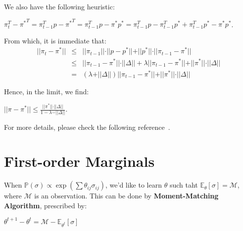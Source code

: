 \documentclass[letterpaper, 11pt, reqno]{amsart}
\begin{document}
	We also have the following heuristic:
		\begin{center}
			$\pi_t^T - {\pi^*}^T = \pi_{t-1}^T p - {\pi^*}^T = \pi_{t-1}^T p - \pi^* p^* = \pi_{t-1}^T p - \pi_{t-1}^T p^* + \pi_{t-1}^T p^* - \pi^* p^*$.
		\end{center}
	
	From which, it is immediate that:
		\begin{eqnarray*}
			\vert\vert \pi_t - \pi^* \vert\vert &\leq& \vert\vert \pi_{t-1} \vert\vert \cdot \vert\vert p-p^* \vert\vert + \vert\vert p^* \vert\vert \cdot \vert\vert \pi_{t-1} - \pi^* \vert\vert \\
			&\leq& \vert\vert \pi_{t-1} - \pi^* \vert\vert \cdot \vert\vert \Delta \vert\vert + \lambda \vert\vert \pi_{t-1} - \pi^* \vert\vert + \vert\vert \pi^* \vert\vert \cdot \vert\vert \Delta \vert\vert \\
			&=& (\lambda + \vert\vert \Delta \vert\vert) \vert\vert \pi_{t-1} - \pi^* \vert\vert + \vert\vert \pi^* \vert\vert \cdot \vert\vert \Delta \vert\vert
		\end{eqnarray*}
	
	Hence, in the limit, we find:
		\begin{center}
			$\displaystyle \vert\vert \pi - \pi^* \vert\vert \leq \frac{\vert\vert \pi^* \vert\vert \cdot \vert\vert \Delta \vert\vert}{1 - \lambda - \vert\vert \Delta \vert\vert}$.
		\end{center}

	For more details, please check the following reference~\cite{negahban2012iterative}.

\section{First-order Marginals}
	When $\mathbb{P}(\sigma) \propto \exp(\sum \theta_{ij} \sigma_{ij})$, we'd like to learn $\theta$ such taht $\mathbb{E}_{\theta} [\sigma] = \mathcal{M}$, where $\mathcal{M}$ is an observation. This can be done by {\bf Moment-Matching Algorithm}, prescribed by:
		\begin{center}
			$\displaystyle \theta^{t+1} - \theta^t = \mathcal{M} - \mathbb{E}_{\theta^t} [\sigma]$
		\end{center}

{
\linespread{1.5}


}
\end{document}
